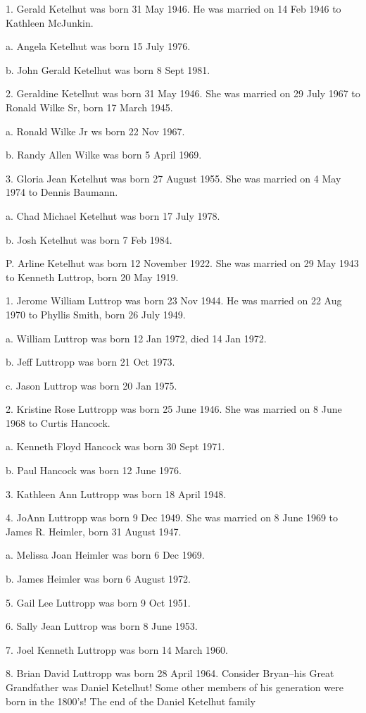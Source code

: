 \documentclass[a4paper]{article}
\begin{document}
1. Gerald Ketelhut was born 31 May 1946.  He was married on 14 Feb 1946 to Kathleen McJunkin.

a. Angela Ketelhut was born 15 July 1976.

b. John Gerald Ketelhut was born 8 Sept 1981.  

2. Geraldine Ketelhut was born 31 May 1946.  She was married on 29 July 1967 to Ronald Wilke Sr, born 17 March 1945.

a. Ronald Wilke Jr ws born 22 Nov 1967.

b. Randy Allen Wilke was born 5 April 1969.

3. Gloria Jean Ketelhut was born 27 August 1955.  She was married on 4 May 1974 to Dennis Baumann.

a. Chad Michael Ketelhut was born 17 July 1978.

b. Josh Ketelhut was born 7 Feb 1984.  

P. Arline Ketelhut was born 12 November 1922.  She was married on 29 May 1943 to Kenneth Luttrop, born 20 May 1919.

1. Jerome William Luttrop was born 23 Nov 1944.  He was married on 22 Aug 1970 to Phyllis Smith, born 26 July 1949.

a. William Luttrop was born 12 Jan 1972, died 14 Jan 1972.

b. Jeff Luttropp was born 21 Oct 1973.

c. Jason Luttrop was born 20 Jan 1975.

2. Kristine Rose Luttropp was born 25 June 1946.  She was married on 8 June 1968 to Curtis Hancock.  

a. Kenneth Floyd Hancock was born 30 Sept 1971.

b. Paul Hancock was born 12 June 1976.

3. Kathleen Ann Luttropp was born 18 April 1948.

4. JoAnn Luttropp was born 9 Dec 1949.  She was married on 8 June 1969 to James R. Heimler, born 31 August 1947.

a. Melissa Joan Heimler was born 6 Dec 1969.

b. James Heimler was born 6 August 1972.

5. Gail Lee Luttropp was born 9 Oct 1951.

6. Sally Jean Luttrop was born 8 June 1953.

7. Joel Kenneth Luttropp was born 14 March 1960.

8. Brian David Luttropp was born 28 April 1964.  Consider Bryan--his Great Grandfather was Daniel Ketelhut!  Some other members of his generation were born in the 1800's!
\vskip 4mm
 The end of the Daniel Ketelhut family 
\end{document}
